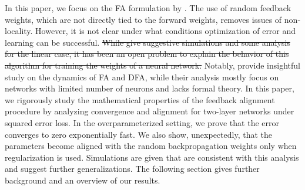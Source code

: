 {\color{red} 
In this paper, we focus on the FA formulation by \cite{lillicrap2016random}.
} 
The use of random feedback weights, which are not directly tied to the forward weights, removes issues of non-locality. However, it is not clear under what conditions optimization of error and learning can be successful. 
\sout{While \mbox{\citet{lillicrap2016random}} give suggestive simulations and some analysis for the linear case, it has been an open problem to explain the behavior of this algorithm for training the weights of a neural network.}
{\color{red}
Notably, \citet{refinetti2021align} provide insightful study on the dynamics of FA and DFA, while their analysis mostly focus on networks with limited number of neurons and lacks formal theory.
}
In this paper, we 
{\color{red}
rigorously
}
study the mathematical properties of the feedback alignment procedure by analyzing convergence and alignment for two-layer networks under squared error loss. In the overparameterized setting, we prove that the error converges to zero exponentially fast. We also show, unexpectedly, that the parameters become aligned with the random backpropagation weights only when regularization is used. Simulations are given that are consistent with this analysis and suggest further generalizations. The following section gives further background and an overview of our results.


